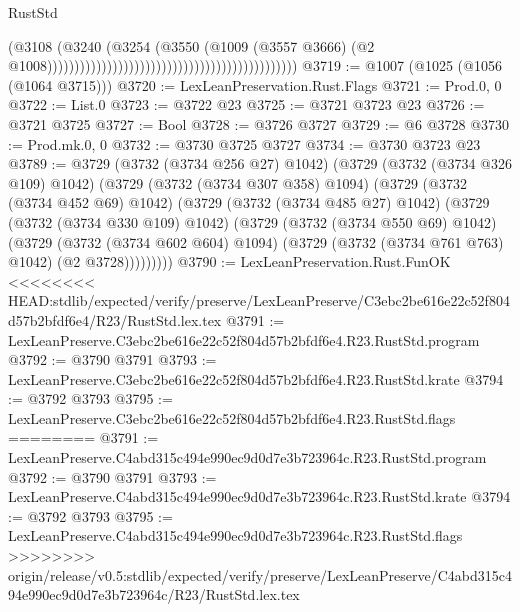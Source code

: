\begin{lexlean}{RustStd}
\begin{coremodule}
{\begin{coremodule}
{{{{{{{{{{{{{{{{{{{{{{{{{{{{{{{{{{{                                                                                    (@3108
                                                                                      (@3240
                                                                                        (@3254
                                                                                          (@3550
                                                                                            (@1009
                                                                                              (@3557
                                                                                                @3666)
                                                                                              (@2
                                                                                                @1008))))))))))))))))))))))))))))))))))))))))))))))
@3719 := @1007 (@1025 (@1056 (@1064 @3715)))
@3720 := LexLeanPreservation.Rust.Flags
@3721 := Prod.{0, 0}
@3722 := List.{0}
@3723 := @3722 @23
@3725 := @3721 @3723 @23
@3726 := @3721 @3725
@3727 := Bool
@3728 := @3726 @3727
@3729 := @6 @3728
@3730 := Prod.mk.{0, 0}
@3732 := @3730 @3725 @3727
@3734 := @3730 @3723 @23
@3789 := @3729
    (@3732 (@3734 @256 @27) @1042)
    (@3729
      (@3732 (@3734 @326 @109) @1042)
      (@3729
        (@3732 (@3734 @307 @358) @1094)
        (@3729
          (@3732 (@3734 @452 @69) @1042)
          (@3729
            (@3732 (@3734 @485 @27) @1042)
            (@3729
              (@3732 (@3734 @330 @109) @1042)
              (@3729
                (@3732 (@3734 @550 @69) @1042)
                (@3729
                  (@3732 (@3734 @602 @604) @1094)
                  (@3729 (@3732 (@3734 @761 @763) @1042) (@2 @3728)))))))))
@3790 := LexLeanPreservation.Rust.FunOK
<<<<<<<< HEAD:stdlib/expected/verify/preserve/LexLeanPreserve/C3ebc2be616e22c52f804d57b2bfdf6e4/R23/RustStd.lex.tex
@3791 := LexLeanPreserve.C3ebc2be616e22c52f804d57b2bfdf6e4.R23.RustStd.program
@3792 := @3790 @3791
@3793 := LexLeanPreserve.C3ebc2be616e22c52f804d57b2bfdf6e4.R23.RustStd.krate
@3794 := @3792 @3793
@3795 := LexLeanPreserve.C3ebc2be616e22c52f804d57b2bfdf6e4.R23.RustStd.flags
========
@3791 := LexLeanPreserve.C4abd315c494e990ec9d0d7e3b723964c.R23.RustStd.program
@3792 := @3790 @3791
@3793 := LexLeanPreserve.C4abd315c494e990ec9d0d7e3b723964c.R23.RustStd.krate
@3794 := @3792 @3793
@3795 := LexLeanPreserve.C4abd315c494e990ec9d0d7e3b723964c.R23.RustStd.flags
>>>>>>>> origin/release/v0.5:stdlib/expected/verify/preserve/LexLeanPreserve/C4abd315c494e990ec9d0d7e3b723964c/R23/RustStd.lex.tex
}}}}}}}}}}}}}}}}}}}}}}}}}}}}}}}}}}}
\end{coremodule}}
\end{coremodule}
\end{lexlean}
